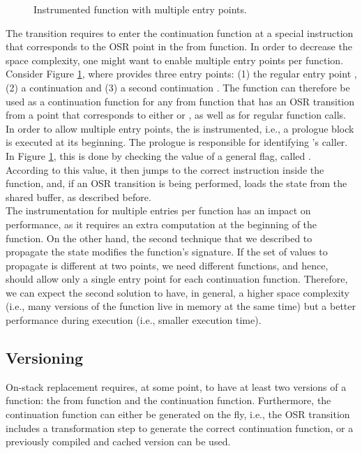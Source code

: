 \begin{figure}[h!]
\centering
\begin{subfigure}{.8\textwidth}
\end{subfigure}
\caption{Instrumented function with multiple entry points.}
\label{fig:multipleentry}
\end{figure}

The transition requires to enter the continuation function at a special instruction that corresponds to the OSR point in the from function.
In order to decrease the space complexity, one might want to enable multiple entry points per function.
Consider Figure \ref{fig:multipleentry}, where  provides three entry points: (1) the regular entry point , (2) a continuation  and (3) a second continuation .
The function  can therefore be used as a continuation function for any from function that has an OSR transition from a point that corresponds to either  or , as well as for regular function calls.
In order to allow multiple entry points, the  is instrumented, i.e., a prologue block is executed at its beginning.
The prologue is responsible for identifying 's caller. 
In Figure \ref{fig:multipleentry}, this is done by checking the value of a general flag, called .
According to this value, it then jumps to the correct instruction inside the function, and, if an OSR transition is being performed, loads the state from the shared buffer, as described before.\\

The instrumentation for multiple entries per function has an impact on performance, as it requires an extra computation at the beginning of the function. 
On the other hand, the second technique that we described to propagate the state modifies the function's signature.
If the set of values to propagate is different at two points, we need different functions, and hence, should allow only a single entry point for each continuation function.
Therefore, we can expect the second solution to have, in general, a higher space complexity (i.e., many versions of the function live in memory at the same time) but a better performance during execution (i.e., smaller execution time).\\

\subsection{Versioning}
On-stack replacement requires, at some point, to have at least two versions of a function: the from function and the continuation function.
Furthermore, the continuation function can either be generated on the fly, i.e., the OSR transition includes a transformation step to generate the correct continuation function, or a previously compiled and cached version can be used.

